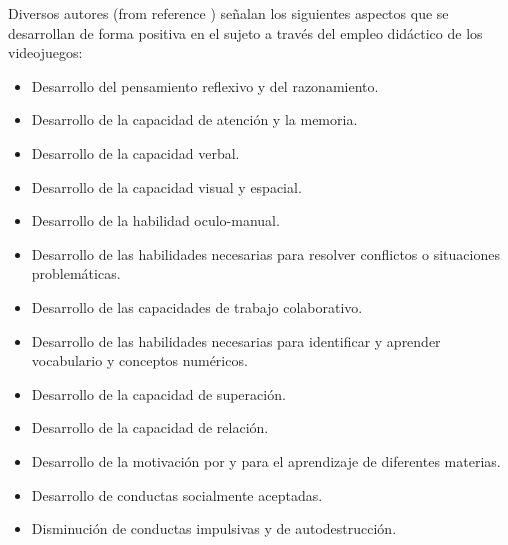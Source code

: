 \documentclass{bmcart}
\begin{document}
Diversos autores (from reference \cite{funk1993reevaluating} \cite{mcfa} \cite{etche} \cite{GRECTPPR-022840}) señalan los siguientes aspectos que se desarrollan de forma positiva en el sujeto a través del empleo didáctico de los videojuegos:
	\newline
	\begin{itemize}
		\item Desarrollo del pensamiento reflexivo y del razonamiento.
		\item Desarrollo de la capacidad de atención y la memoria.
		\item Desarrollo de la capacidad verbal.
		\item Desarrollo de la capacidad visual y espacial.
		\item Desarrollo de la habilidad oculo-manual.
		\item Desarrollo de las habilidades necesarias para resolver conflictos o situaciones problemáticas.
		\item Desarrollo de las capacidades de trabajo colaborativo.
		\item Desarrollo de las habilidades necesarias para identificar y aprender vocabulario y conceptos numéricos.
		\item Desarrollo de la capacidad de superación.
		\item Desarrollo de la capacidad de relación.
		\item Desarrollo de la motivación por y para el aprendizaje de diferentes materias.
		\item Desarrollo de conductas socialmente aceptadas.
		\item Disminución de conductas impulsivas y de autodestrucción.
	\end{itemize}
	
\end{document}
